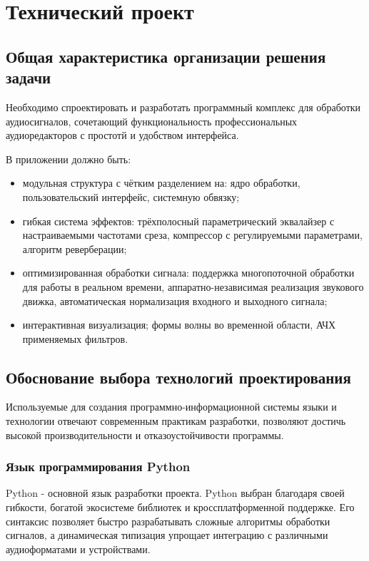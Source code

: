 \section{Технический проект}

\subsection{Общая характеристика организации решения задачи}

Необходимо спроектировать и разработать программный комплекс для обработки аудиосигналов, сочетающий функциональность профессиональных аудиоредакторов с простотй и удобством интерфейса.

В приложении должно быть:
\begin{itemize}
	\item модульная структура с чётким разделением на: ядро обработки, пользовательский интерфейс, системную обвязку;
	\item гибкая система эффектов: трёхполосный параметрический эквалайзер с настраиваемыми частотами среза, компрессор с регулируемыми параметрами, алгоритм реверберации;
	\item оптимизированная обработки сигнала: поддержка многопоточной обработки для работы в реальном времени, аппаратно-независимая реализация звукового движка, автоматическая нормализация входного и выходного сигнала;
	\item интерактивная визуализация; формы волны во временной области, АЧХ применяемых фильтров.
\end{itemize}
 
\subsection{Обоснование выбора технологий проектирования}

Используемые для создания программно-информационной системы языки и технологии отвечают современным практикам разработки, позволяют достичь высокой производительности и отказоустойчивости программы.

\subsubsection{Язык программирования Python}

Python - основной язык разработки проекта. Python выбран благодаря своей гибкости, богатой экосистеме библиотек и кроссплатформенной поддержке. Его синтаксис позволяет быстро разрабатывать сложные алгоритмы обработки сигналов, а динамическая типизация упрощает интеграцию с различными аудиоформатами и устройствами.

